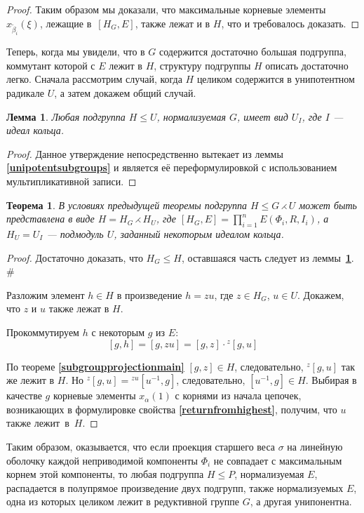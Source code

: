\documentclass[12pt]{matmex-diploma}
\theoremstyle{mystyleni}
\theoremstyle{mystyle}
\newtheorem{thm}{Теорема}
\newtheorem{lm}{Лемма}
\newcommand\refb[1]{\textbf{\ref{#1}}}
\renewcommand{\le}{\leqslant}
\begin{document}
\begin{proof}
Таким образом мы доказали, что максимальные корневые элементы $x_{\widetilde\beta_i}(\xi)$, лежащие в~$[H_G,E]$, также лежат и в $H$, что и требовалось доказать.

\end{proof}

Теперь, когда мы увидели, что в $G$ содержится достаточно большая подгруппа, коммутант которой с $E$ лежит в $H$, структуру подгруппы $H$ описать достаточно легко. Сначала рассмотрим случай, когда $H$ целиком содержится в унипотентном радикале $U$, а затем докажем общий случай.

\newpage
\begin{lm}\label{unipotenttransitivity}
  Любая подгруппа $H \le U$, нормализуемая $G$, имеет вид $U_I$, где $I$ --- идеал кольца.
\end{lm}
\begin{proof}
Данное утверждение непосредственно вытекает из леммы \refb{unipotentsubgroups} и является её переформулировкой с использованием мультипликативной записи.
\end{proof}
\begin{thm}
В условиях предыдущей теоремы подгруппа $H\le G \rightthreetimes U$ может быть представлена в виде $H = H_G \rightthreetimes H_U$, где $[H_G,E] = \prod_{i=1}^n E(\Phi_i, R, I_i)$, а $H_U=U_I$ --- подмодуль $U$, заданный некоторым идеалом кольца.
\end{thm}
\begin{proof}
Достаточно доказать, что $H_G \le H$, оставшаяся часть следует из леммы~\refb{unipotenttransitivity}. \#

Разложим элемент $h \in H$ в произведение $h = z u$, где $z \in H_G$, $u \in U$. Докажем, что $z$ и $u$ также лежат в $H$.

Прокоммутируем $h$ с некоторым $g$ из $E$:
$$ [g, h] = [g,zu] = [g,z] \cdot {}^z[g,u] $$

По теореме \refb{subgroupprojectionmain} $[g,z]\in H$, следовательно, ${}^z[g,u]$ так же лежит в $H$. Но
$ {}^z[g,u] = {}^{zu}[u^{-1},g] $, следовательно, $[u^{-1},g] \in H$. Выбирая в качестве $g$ корневые элементы $x_\alpha(1)$ с корнями из начала цепочек, возникающих в формулировке свойства \refb{returnfromhighest}, получим, что $u$ также лежит~в~$H$.
\end{proof}

Таким образом, оказывается, что если проекция старшего веса $\sigma$ на линейную оболочку каждой неприводимой компоненты $\Phi_i$ не совпадает с максимальным корнем этой компоненты, то любая подгруппа $H \le P$, нормализуемая $E$, распадается в полупрямое произведение двух подгрупп, также нормализуемых $E$, одна из которых целиком лежит в редуктивной группе $G$, а другая унипонентна.
\end{document}
